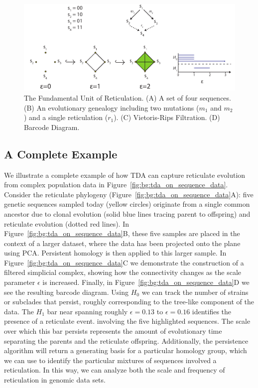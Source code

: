 \begin{figure}
	\centering
	\includegraphics[width=\textwidth]{./fig/background/four_gamete_test.pdf}
	\caption[Fundamental Unit of Reticulation]{The Fundamental Unit of Reticulation. (A) A set of four sequences. (B) An evolutionary genealogy including two mutations ($m_1$ and $m_2$) and a single reticulation ($r_1$). (C) Vietoris-Rips Filtration. (D) Barcode Diagram.}
	\label{fig:bg:four_gamete_test}
\end{figure}

\subsection{A Complete Example}
\label{bg:top4bio:full_example}

We illustrate a complete example of how TDA can capture reticulate evolution from complex population data in Figure~\ref{fig:bg:tda_on_sequence_data}.
Consider the reticulate phylogeny (Figure~\ref{fig:bg:tda_on_sequence_data}A): five genetic sequences sampled today (yellow circles) originate from a single common ancestor due to clonal evolution (solid blue lines tracing parent to offspring) and reticulate evolution (dotted red lines).
In Figure~\ref{fig:bg:tda_on_sequence_data}B, these five samples are placed in the context of a larger dataset, where the data has been projected onto the plane using PCA.
Persistent homology is then applied to this larger sample.
In Figure~\ref{fig:bg:tda_on_sequence_data}C we demonstrate the construction of a filtered simplicial complex, showing how the connectivity changes as the scale parameter $\epsilon$ is increased.
Finally, in Figure~\ref{fig:bg:tda_on_sequence_data}D we see the resulting barcode diagram.
Using $H_0$ we can track the number of strains or subclades that persist, roughly corresponding to the tree-like component of the data.
The $H_1$ bar near spanning roughly $\epsilon=0.13$ to $\epsilon=0.16$ identifies the presence of a reticulate event. involving the five highlighted sequences.
The scale over which this bar persists represents the amount of evolutionary time separating the parents and the reticulate offspring.
Additionally, the persistence algorithm will return a generating basis for a particular homology group, which we can use to identify the particular mixtures of sequences involved a reticulation.
In this way, we can analyze both the scale and frequency of reticulation in genomic data sets.

